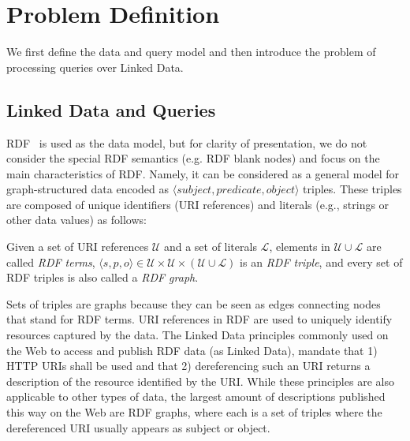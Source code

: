 \section{Problem Definition}
\label{sec:problem}
We first define the data and query model and then
introduce the problem of processing queries over Linked Data.

\subsection{Linked Data and Queries} 
RDF~\cite{klyne_resource_2004} is used as the data model, but for
clarity of presentation, we do not consider the special RDF semantics
(e.g. RDF blank nodes) and focus on the main characteristics of RDF.
Namely, it can be considered as a general model for
graph-structured data encoded as $\langle subject, predicate, object
\rangle$ triples. These triples are composed of unique identifiers
(URI references) and literals (e.g., strings or other data values) as
follows:


\begin{definition}
  Given a set of URI references $\mathcal{U}$ and a set of literals
  $\mathcal{L}$, elements in $\mathcal{U} \cup \mathcal{L}$ are called
  \emph{RDF terms}, $\langle s, p, o\rangle \in \mathcal{U} \times
  \mathcal{U} \times (\mathcal{U} \cup \mathcal{L})$ is an \emph{RDF
    triple}, and every set of RDF triples is also called a \emph{RDF
    graph}.
\end{definition}

Sets of triples are graphs because they can be seen as edges
connecting nodes that stand for RDF terms. URI references in RDF are
used to uniquely identify resources captured by the data.
The Linked Data principles \cite{bizer_linked_2009} commonly used on
the Web to access and publish RDF data (as Linked Data), mandate that
1) HTTP URIs shall be used and that 2) dereferencing such an URI
returns a description of the resource identified by the URI. While
these principles are also applicable to other types of data, the
largest amount of descriptions published this way on the Web are RDF
graphs, where each is a set of triples where the dereferenced URI
usually appears as subject or object.


